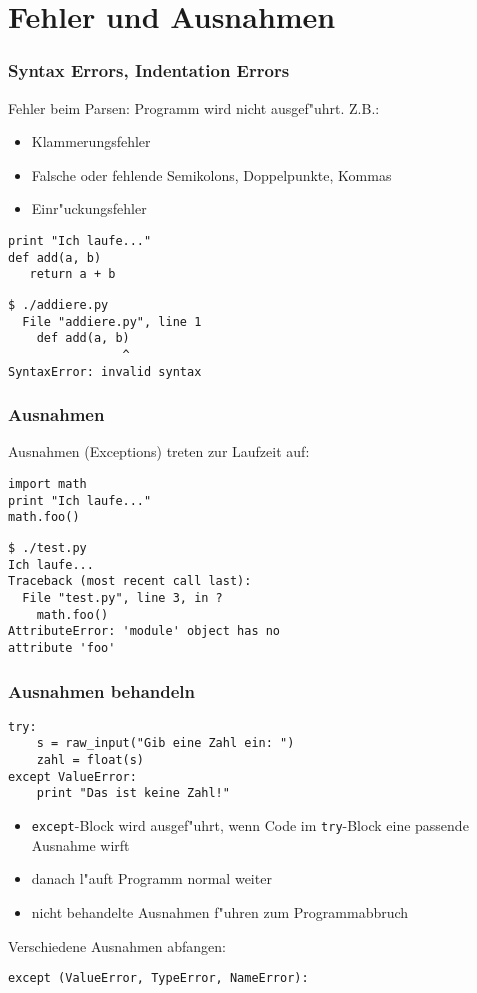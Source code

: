 \section{Fehler und Ausnahmen}

\begin{frame}[fragile]
\frametitle{Syntax Errors, Indentation Errors}
Fehler beim Parsen: \alert{Programm wird nicht ausgef"uhrt}. Z.B.: 
\begin{itemize}
\item Klammerungsfehler
\item Falsche oder fehlende Semikolons, Doppelpunkte, Kommas
\item Einr"uckungsfehler
\end{itemize}
\begin{lstlisting}[style=Python]
print "Ich laufe..."
def add(a, b)
   return a + b
\end{lstlisting}
\begin{lstlisting}[style=Shell]
$ ./addiere.py
  File "addiere.py", line 1
    def add(a, b)
                ^
SyntaxError: invalid syntax
\end{lstlisting}
\end{frame}

\begin{frame}[fragile]
\frametitle{Ausnahmen}
Ausnahmen (Exceptions) treten \alert{zur Laufzeit} auf:
\begin{lstlisting}[style=Python]
import math
print "Ich laufe..."
math.foo()
\end{lstlisting}
\begin{lstlisting}[style=Shell]
$ ./test.py
Ich laufe...
Traceback (most recent call last):
  File "test.py", line 3, in ?
    math.foo()
AttributeError: 'module' object has no 
attribute 'foo'
\end{lstlisting}
\end{frame}

\begin{frame}[fragile]
\frametitle{Ausnahmen behandeln}
\begin{lstlisting}[style=Python]
try:
    s = raw_input("Gib eine Zahl ein: ")
    zahl = float(s)
except ValueError:
    print "Das ist keine Zahl!"
\end{lstlisting}
\begin{itemize}
\item \texttt{except}-Block wird ausgef"uhrt, wenn Code im \texttt{try}-Block eine passende Ausnahme wirft
\item danach l"auft Programm normal weiter
\item nicht behandelte Ausnahmen f"uhren zum Programmabbruch
\end{itemize}
Verschiedene Ausnahmen abfangen:
\begin{lstlisting}[style=Python]
except (ValueError, TypeError, NameError):
\end{lstlisting}
\end{frame}

